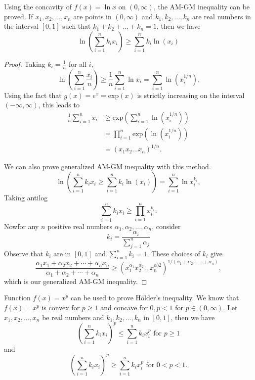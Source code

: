 \begin{remark}
  Using the concavity of $f(x) = \ln x$ on $(0, \infty)$, the AM-GM inequality can be proved. If $x_1, x_2, \ldots, x_n$ are points
  in $(0, \infty)$ and $k_1, k_2, \ldots, k_n$ are real numbers in the interval $[0,1]$ such that $k_1 + k_2 + \ldots + k_n = 1$,
  then we have
  $$\ln\left(\sum_{i=1}^nk_ix_i\right)\geq\sum_{i=1}^nk_i\ln(x_i)$$
\end{remark}

\begin{proof}
  Taking $k_i = \frac{1}{n}$ for all $i$,
  $$\ln\left(\sum_{i=1}^n\frac{x_i}{n}\right)\geq\frac{1}{n}\sum_{i=1}^n\ln x_i = \sum_{i=1}^n\ln\left(x_i^{1/n}\right).$$
  Using the fact that $g(x) = e^x = {\mathrm{exp}}(x)$ is strictly increasing on the interval $(-\infty, \infty)$, this leads to
  $$\begin{aligned}\frac{1}{n}\sum_{i=1}^nx_i & \geq{\mathrm{exp}}\left(\sum_{i=1}^n\ln\left(x_i^{1/n}\right)\right)\\&
    =\prod_{i=1}^n\mathrm{exp}\left(\ln\left(x_i^{1/n}\right)\right)\\& = \left(x_1x_2\ldots x_n\right)^{1/n}.\end{aligned}$$

  We can also prove generalized AM-GM inequality with this method.
  $$\ln\left(\sum_{i=1}^nk_ix_i\geq\sum_{i=1}^nk_i\ln(x_i)\right) = \sum_{i=1}^n\ln x_i^{k_i},$$
  Taking antilog
  $$\sum_{i=1}^nk_ix_i\geq\prod_{i=1}^nx_i^{k_i}.$$
  Nowfor any $n$ positive real numbers $\alpha_1, \alpha_2, \ldots, \alpha_n$, consider
  $$k_i = \frac{\alpha_i}{\sum_{j=1}^n\alpha_j}$$
  Observe that $k_i$ are in $[0, 1]$ and $\sum_{i=1}^nk_i = 1$. These choices of $k_i$ give
  $$\frac{\alpha_1x_1 + \alpha_2x_2 + \cdots + \alpha_nx_n}{\alpha_1 + \alpha_2 + \cdots +
    \alpha_n}\geq\left(x_1^{\alpha_1}x_2^{\alpha_2}\ldots x_n^{\alpha)2}\right)^{1/(\alpha_1 + \alpha_2 + \cdots + \alpha_n)},$$
  which is our generalized AM-GM inequality.
\end{proof}

\begin{remark}
  Function $f(x) = x^p$ can be used to prove H\"{o}lder's inequality. We know that $f(x) = x^p$ is convex for $p\geq 1$ and concave
  for $0,p<1$ for $p\in(0, \infty)$. Let $x_1, x_2, \ldots, x_n$ be real numbers and $k_1, k_2, \ldots, k_n$ in $[0, 1]$, then we
  have
  $$\left(\sum_{i=1}^nk_ix_i\right)^p\leq \sum_{i=1}^nk_ix_i^p\text{~for~}p\geq 1$$
  and
  $$\left(\sum_{i=1}^nk_ix_i\right)^p\geq \sum_{i=1}^nk_ix_i^p\text{~for~}0<p<1.$$
\end{remark}

